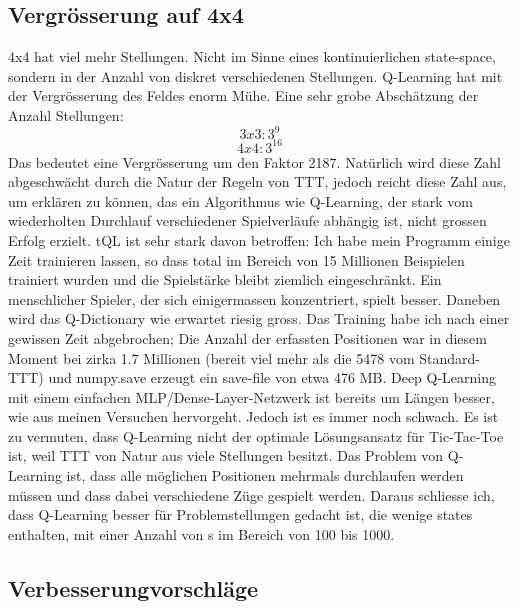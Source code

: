 \documentclass[12pt,a4paper]{article}
\begin{document}
\subsection{Vergrösserung auf 4x4}
4x4 hat viel mehr Stellungen. Nicht im Sinne eines kontinuierlichen state-space, sondern in der Anzahl von diskret verschiedenen Stellungen. Q-Learning hat mit der Vergrösserung des Feldes enorm Mühe. Eine sehr grobe Abschätzung der Anzahl Stellungen: 
$$3x3: 3^9 $$
$$4x4 : 3^{16} $$
Das bedeutet eine Vergrösserung um den Faktor 2187. Natürlich wird diese Zahl abgeschwächt durch die Natur der Regeln von TTT, jedoch reicht diese Zahl aus, um erklären zu können, das ein Algorithmus wie Q-Learning, der stark vom wiederholten Durchlauf verschiedener Spielverläufe abhängig ist, nicht grossen Erfolg erzielt. tQL ist sehr stark davon betroffen: Ich habe mein Programm einige Zeit trainieren lassen, so dass total im Bereich von 15 Millionen Beispielen trainiert wurden und die Spielstärke bleibt ziemlich eingeschränkt. Ein menschlicher Spieler, der sich einigermassen konzentriert, spielt besser. Daneben wird das Q-Dictionary wie erwartet riesig gross. Das Training habe ich nach einer gewissen Zeit abgebrochen; Die Anzahl der erfassten Positionen war in diesem Moment bei zirka 1.7 Millionen (bereit viel mehr als die 5478\cite{numttt} vom Standard-TTT) und numpy.save erzeugt ein save-file von etwa 476 MB. 
Deep Q-Learning mit einem einfachen MLP/Dense-Layer-Netzwerk ist bereits um Längen besser, wie aus meinen Versuchen hervorgeht. Jedoch ist es immer noch schwach.
Es ist zu vermuten, dass Q-Learning nicht der optimale Lösungsansatz für Tic-Tac-Toe ist, weil TTT von Natur aus viele Stellungen besitzt. Das Problem von Q-Learning ist, dass alle möglichen Positionen mehrmals durchlaufen werden müssen und dass dabei verschiedene Züge gespielt werden. Daraus schliesse ich, dass Q-Learning besser für Problemstellungen gedacht ist, die wenige states enthalten, mit einer Anzahl von s im Bereich von 100 bis 1000.

\subsection{Verbesserungvorschläge}
\end{document}
